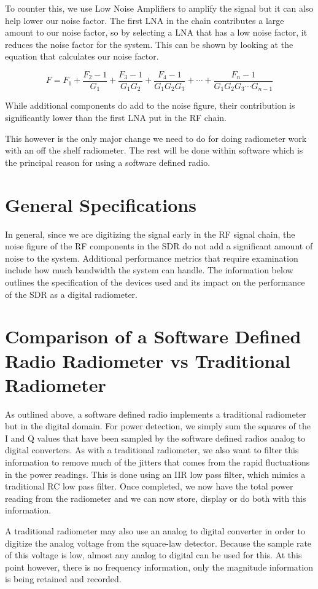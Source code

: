 To counter this, we use Low Noise Amplifiers to amplify the signal but it can also help lower our noise factor.  The first LNA in the chain contributes a large amount to our noise factor, so by selecting a LNA that has a low noise factor, it reduces the noise factor for the system.  This can be shown by looking at the equation that calculates our noise factor.

\begin{equation}\label{noise_factor}
F=F_1+\frac{F_2-1}{G_1}+\frac{F_3-1}{G_1 G_2}+\frac{F_4-1}{G_1 G_2 G_3}+\cdots +\frac{F_n-1}{G_1 G_2 G_3 \cdots G_{n-1}}
\end{equation}

While additional components do add to the noise figure, their contribution is significantly lower than the first LNA put in the RF chain.

This however is the only major change we need to do for doing radiometer work with an off the shelf radiometer.  The rest will be done within software which is the principal reason for using a software defined radio.

\section{General Specifications}
In general, since we are digitizing the signal early in the RF signal chain, the noise figure of the RF components in the SDR do not add a significant amount of noise to the system.  Additional performance metrics that require examination include how much bandwidth the system can handle.   The information below outlines the specification of the devices used and its impact on the performance of the SDR as a digital radiometer.   

\section{Comparison of a Software Defined Radio Radiometer vs Traditional Radiometer}

As outlined above, a software defined radio implements a traditional radiometer but in the digital domain.  For power detection, we simply sum the squares of the I and Q values that have been sampled by the software defined radios analog to digital converters.  As with a traditional radiometer, we also want to filter this information to remove much of the jitters that comes from the rapid fluctuations in the power readings.  This is done using an IIR low pass filter, which mimics a traditional RC low pass filter.  Once completed, we now have the total power reading from the radiometer and we can now store, display or do both with this information.  

A traditional radiometer may also use an analog to digital converter in order to digitize the analog voltage from the square-law detector.  Because the sample rate of this voltage is low, almost any analog to digital can be used for this.  At this point however, there is no frequency information, only the magnitude information is being retained and recorded.

